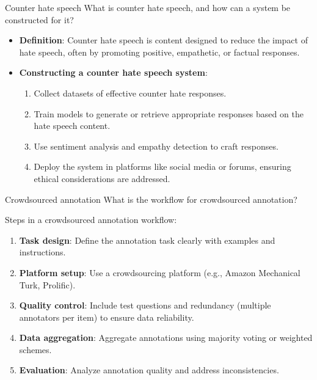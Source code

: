 \documentclass{article}
\begin{document}
\begin{exercise}{Counter hate speech}
  What is counter hate speech, and how can a system be constructed for it?

  \begin{solution}
    \begin{itemize}
        \item \textbf{Definition}: Counter hate speech is content designed to reduce the impact of hate speech, often by promoting positive, empathetic, or factual responses.
        \item \textbf{Constructing a counter hate speech system}:
        \begin{enumerate}
            \item Collect datasets of effective counter hate responses.
            \item Train models to generate or retrieve appropriate responses based on the hate speech content.
            \item Use sentiment analysis and empathy detection to craft responses.
            \item Deploy the system in platforms like social media or forums, ensuring ethical considerations are addressed.
        \end{enumerate}
    \end{itemize}
  \end{solution}
\end{exercise}

\begin{exercise}{Crowdsourced annotation}
  What is the workflow for crowdsourced annotation?

  \begin{solution}
    Steps in a crowdsourced annotation workflow:
    \begin{enumerate}
        \item \textbf{Task design}: Define the annotation task clearly with examples and instructions.
        \item \textbf{Platform setup}: Use a crowdsourcing platform (e.g., Amazon Mechanical Turk, Prolific).
        \item \textbf{Quality control}: Include test questions and redundancy (multiple annotators per item) to ensure data reliability.
        \item \textbf{Data aggregation}: Aggregate annotations using majority voting or weighted schemes.
        \item \textbf{Evaluation}: Analyze annotation quality and address inconsistencies.
    \end{enumerate}
  \end{solution}
\end{exercise}
\end{document}
